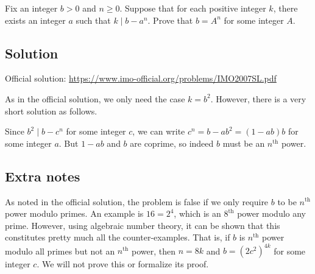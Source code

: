 Fix an integer $b > 0$ and $n \geq 0$.
Suppose that for each positive integer $k$, there exists an integer $a$ such that $k \mid b - a^n$.
Prove that $b = A^n$ for some integer $A$.



\subsection*{Solution}

Official solution: \url{https://www.imo-official.org/problems/IMO2007SL.pdf}

As in the official solution, we only need the case $k = b^2$.
However, there is a very short solution as follows.

Since $b^2 \mid b - c^n$ for some integer $c$, we can write $c^n = b - ab^2 = (1 - ab) b$ for some integer $a$.
But $1 - ab$ and $b$ are coprime, so indeed $b$ must be an $n^{\text{th}}$ power.



\subsection*{Extra notes}

As noted in the official solution, the problem is false if we only require $b$ to be $n^{\text{th}}$ power modulo primes.
An example is $16 = 2^4$, which is an $8^{\text{th}}$ power modulo any prime.
However, using algebraic number theory, it can be shown that this constitutes pretty much all the counter-examples.
That is, if $b$ is $n^{\text{th}}$ power modulo all primes but not an $n^{\text{th}}$ power, then $n = 8k$ and $b = (2c^2)^{4k}$ for some integer $c$.
We will not prove this or formalize its proof.
